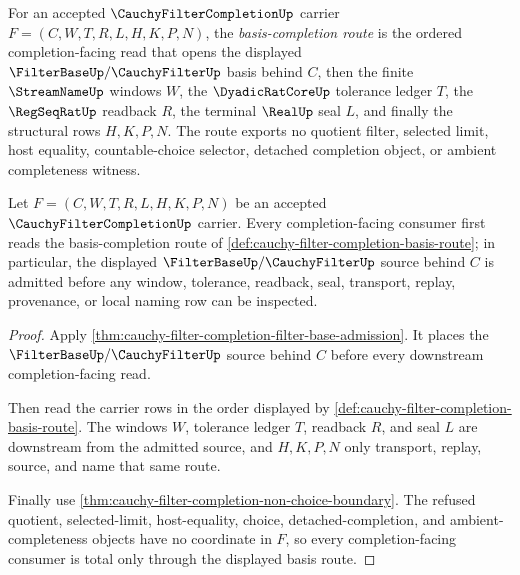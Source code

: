 \begin{definition}
\label{def:cauchy-filter-completion-basis-route}
For an accepted $\CauchyFilterCompletionUp$ carrier $F=(C,W,T,R,L,H,K,P,N)$, the \emph{basis-completion route} is the ordered completion-facing read that opens the displayed $\FilterBaseUp/\CauchyFilterUp$ basis behind $C$, then the finite $\StreamNameUp$ windows $W$, the $\DyadicRatCoreUp$ tolerance ledger $T$, the $\RegSeqRatUp$ readback $R$, the terminal $\RealUp$ seal $L$, and finally the structural rows $H,K,P,N$. The route exports no quotient filter, selected limit, host equality, countable-choice selector, detached completion object, or ambient completeness witness.
\end{definition}

\begin{theorem}
\label{thm:cauchy-filter-completion-basis-totality}
Let $F=(C,W,T,R,L,H,K,P,N)$ be an accepted $\CauchyFilterCompletionUp$ carrier. Every completion-facing consumer first reads the basis-completion route of \autoref{def:cauchy-filter-completion-basis-route}; in particular, the displayed $\FilterBaseUp/\CauchyFilterUp$ source behind $C$ is admitted before any window, tolerance, readback, seal, transport, replay, provenance, or local naming row can be inspected.
\end{theorem}
\begin{proof}
Apply \autoref{thm:cauchy-filter-completion-filter-base-admission}. It places the $\FilterBaseUp/\CauchyFilterUp$ source behind $C$ before every downstream completion-facing read.

Then read the carrier rows in the order displayed by \autoref{def:cauchy-filter-completion-basis-route}. The windows $W$, tolerance ledger $T$, readback $R$, and seal $L$ are downstream from the admitted source, and $H,K,P,N$ only transport, replay, source, and name that same route.

Finally use \autoref{thm:cauchy-filter-completion-non-choice-boundary}. The refused quotient, selected-limit, host-equality, choice, detached-completion, and ambient-completeness objects have no coordinate in $F$, so every completion-facing consumer is total only through the displayed basis route.
\end{proof}

